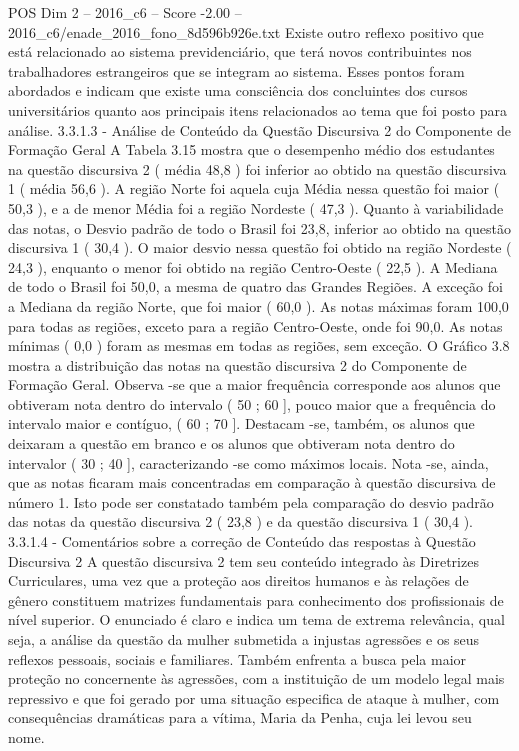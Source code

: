 \begin{textsample}{POS Dim 2 – 2016\_c6 – Score -2.00 – 2016\_c6/enade\_2016\_fono\_8d596b926e.txt}
Existe outro reflexo positivo que está relacionado ao sistema previdenciário, que terá novos contribuintes nos trabalhadores estrangeiros que se integram ao sistema.
Esses pontos foram abordados e indicam que existe uma consciência dos concluintes dos cursos universitários quanto aos principais itens relacionados ao tema que foi posto para análise. 3.3.1.3 - Análise de Conteúdo da Questão Discursiva 2 do Componente de Formação Geral A Tabela 3.15 mostra que o desempenho médio dos estudantes na questão discursiva 2 ( média 48,8 ) foi inferior ao obtido na questão discursiva 1 ( média 56,6 ).
A região Norte foi aquela cuja Média nessa questão foi maior ( 50,3 ), e a de menor Média foi a região Nordeste ( 47,3 ).
Quanto à variabilidade das notas, o Desvio padrão de todo o Brasil foi 23,8, inferior ao obtido na questão discursiva 1 ( 30,4 ).
O maior desvio nessa questão foi obtido na região Nordeste ( 24,3 ), enquanto o menor foi obtido na região Centro-Oeste ( 22,5 ).
A Mediana de todo o Brasil foi 50,0, a mesma de quatro das Grandes Regiões.
A exceção foi a Mediana da região Norte, que foi maior ( 60,0 ).
As notas máximas foram 100,0 para todas as regiões, exceto para a região Centro-Oeste, onde foi 90,0.
As notas mínimas ( 0,0 ) foram as mesmas em todas as regiões, sem exceção.
O Gráfico 3.8 mostra a distribuição das notas na questão discursiva 2 do Componente de Formação Geral.
Observa -se que a maior frequência corresponde aos alunos que obtiveram nota dentro do intervalo ( 50 ; 60 ], pouco maior que a frequência do intervalo maior e contíguo, ( 60 ; 70 ].
Destacam -se, também, os alunos que deixaram a questão em branco e os alunos que obtiveram nota dentro do intervalor ( 30 ; 40 ], caracterizando -se como máximos locais.
Nota -se, ainda, que as notas ficaram mais concentradas em comparação à questão discursiva de número 1.
Isto pode ser constatado também pela comparação do desvio padrão das notas da questão discursiva 2 ( 23,8 ) e da questão discursiva 1 ( 30,4 ). 3.3.1.4 - Comentários sobre a correção de Conteúdo das respostas à Questão Discursiva 2 A questão discursiva 2 tem seu conteúdo integrado às Diretrizes Curriculares, uma vez que a proteção aos direitos humanos e às relações de gênero constituem matrizes fundamentais para conhecimento dos profissionais de nível superior.
O enunciado é claro e indica um tema de extrema relevância, qual seja, a análise da questão da mulher submetida a injustas agressões e os seus reflexos pessoais, sociais e familiares.
Também enfrenta a busca pela maior proteção no concernente às agressões, com a instituição de um modelo legal mais repressivo e que foi gerado por uma situação especifica de ataque à mulher, com consequências dramáticas para a vítima, Maria da Penha, cuja lei levou seu nome.

\end{textsample}

